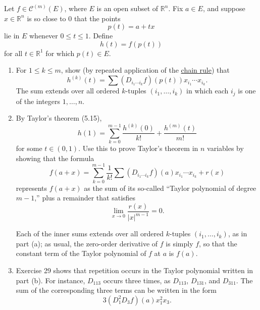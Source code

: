 	\begin{exercise}[Rudin 9.30]
		Let $f\in\mathscr{C}^{(m)}(E)$, where $E$ is an open subset of $\mathbb{R}^n$. Fix $a\in E$, and suppose $x\in\mathbb{R}^n$ is so close to $0$ that the points
		\begin{equation}
			p(t)=a+tx
		\end{equation}
		lie in $E$ whenever $0\leq t\leq1$. Define
		\begin{equation}
			h(t)=f(p(t))
		\end{equation}
		for all $t\in\mathbb{R}^1$ for which $p(t)\in E$.

		\begin{enumerate}[label=(\alph*)]
			\item For $1\leq k\leq m$, show (by repeated application of the \hyperref[thm:chain-rule]{chain rule}) that
			\begin{equation}
				h^{(k)}(t)
				=
				\sum
				(D_{i_1\cdots i_k}f)(p(t))
				x_{i_1}\cdots x_{i_k}.
			\end{equation}
			The sum extends over all ordered $k$-tuples $(i_1,\ldots,i_k)$ in which each $i_j$ is one of the integers $1,\ldots,n$.

			\item By Taylor's theorem (5.15),
			\begin{equation}
				h(1)
				=
				\sum_{k=0}^{m-1}\frac{h^{(k)}(0)}{k!}
				+
				\frac{h^{(m)}(t)}{m!}
			\end{equation}
			for some $t\in(0,1)$. Use this to prove Taylor's theorem in $n$ variables by showing that the formula
			\begin{equation}
				f(a+x)
				=
				\sum_{k=0}^{m-1}
				\frac{1}{k!}
				\sum
				(D_{i_1\cdots i_k}f)(a)
				x_{i_1}\cdots x_{i_k}
				+
				r(x)
			\end{equation}
			represents $f(a+x)$ as the sum of its so-called ``Taylor polynomial of degree $m-1$,'' plus a remainder that satisfies
			\begin{equation}
				\lim_{x\to0}\frac{r(x)}{\lvert x\rvert^{m-1}}=0.
			\end{equation}

			Each of the inner sums extends over all ordered $k$-tuples $(i_1,\ldots,i_k)$, as in part (a); as usual, the zero-order derivative of $f$ is simply $f$, so that the constant term of the Taylor polynomial of $f$ at $a$ is $f(a)$.

			\item Exercise 29 shows that repetition occurs in the Taylor polynomial written in part (b). For instance, $D_{113}$ occurs three times, as $D_{113}$, $D_{131}$, and $D_{311}$. The sum of the corresponding three terms can be written in the form
			\begin{equation}
				3(D_1^2D_3f)(a)x_1^2x_3.
			\end{equation}


\end{enumerate}
\end{exercise}
